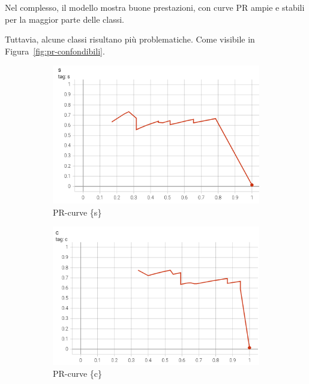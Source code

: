 Nel complesso, il modello mostra buone prestazioni, con curve PR ampie e stabili per la maggior parte delle classi.

Tuttavia, alcune classi risultano più problematiche. Come visibile in Figura~\ref{fig:pr-confondibili}.

\begin{figure}[htbp]
    \centering
    \begin{subfigure}[t]{0.32\textwidth}
        \centering
        \includegraphics[width=\textwidth]{images/pr_curve_conf1.png}
        \caption{PR-curve \{s\}}
    \end{subfigure}
    \begin{subfigure}[t]{0.32\textwidth}
        \centering
        \includegraphics[width=\textwidth]{images/pr_curve_conf2.png}
        \caption{PR-curve \{c\}}
    \end{subfigure}
    \begin{subfigure}[t]{0.32\textwidth}

\end{subfigure}
\end{figure}
